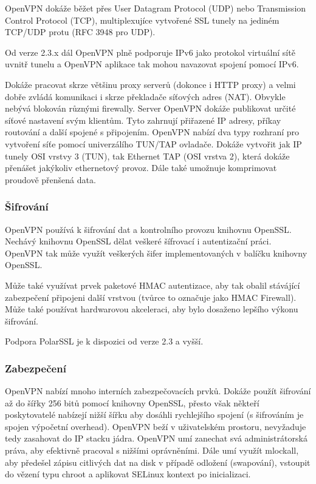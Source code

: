 \documentclass[thesis=B,czech]{FITthesis}[2012/06/26]
\begin{document}
        OpenVPN dokáže běžet přes User Datagram Protocol (UDP) nebo Transmission Control Protocol (TCP), multiplexujíce vytvořené SSL tunely na jediném TCP/UDP protu\cite{openvpn_tls_mode_options} (RFC 3948 pro UDP).\cite{openvpn_udp}

        Od verze 2.3.x dál OpenVPN plně podporuje IPv6 jako protokol virtuální sítě uvnitř tunelu a OpenVPN aplikace tak mohou navazovat spojení pomocí IPv6.\cite{openvpn_community_wiki}

        Dokáže pracovat skrze většinu proxy serverů (dokonce i HTTP proxy) a velmi dobře zvládá komunikaci i skrze překladače síťových adres (NAT). Obvykle nebývá blokován různými firewally.
        Server OpenVPN dokáže publikovat určité síťové nastavení svým klientům. Tyto zahrnují přiřazené IP adresy, příkay routování a další spojené s připojením.
        OpenVPN nabízí dva typy rozhraní pro vytvoření síťe pomocí univerzálího TUN/TAP ovladače. Dokáže vytvořit jak IP tunely OSI vrstvy 3 (TUN), tak Ethernet TAP (OSI vrstva 2), která dokáže přenášet jakýkoliv ethernetový provoz. Dále také umožnuje komprimovat proudově přenšená data.

      \subsubsection{Šifrování}
        OpenVPN používá k šifrování dat a kontrolního provozu knihovnu OpenSSL. Nechávý knihovnu OpenSSL dělat veškeré šífrovací i autentizační práci. OpenVPN tak může využít veškerých šifer implementovaných v balíčku knihovny OpenSSL.

        Může také využívat prvek paketové HMAC autentizace, aby tak obalil stávájící zabezpečení připojeni další vrstvou (tvůrce to označuje jako HMAC Firewall). Může také používat hardwarovou akceleraci, aby bylo dosaženo lepšího výkonu šifrování.\cite{openvpn_enc_1}\cite{openvpn_enc_2}

        Podpora PolarSSL je k dispozici od verze 2.3 a vyšší.\cite{openvpn_enc_3}

	  \subsubsection{Zabezpečení}

		OpenVPN nabízí mnoho interních zabezpečovacích prvků. Dokáže použít šifrování až do šířky 256 bitů pomocí knihovny OpenSSL, přesto však někteří poskytovatelé nabízejí nižší šířku aby dosáhli rychlejšího spojení (s šifrováním je spojen výpočetní overhead).\cite{openvpn_sec}
		OpenVPN beží v uživatelském prostoru, nevyžaduje tedy zasahovat do IP stacku jádra. OpenVPN umí zanechat svá administrátorská práva, aby efektivně pracoval s nižšími oprávněními. Dále umí využít mlockall, aby předešel zápisu citlivých dat na disk v případě odložení (swapování), vstoupit do vězení typu chroot a aplikovat SELinux kontext po inicializaci.
\end{document}

